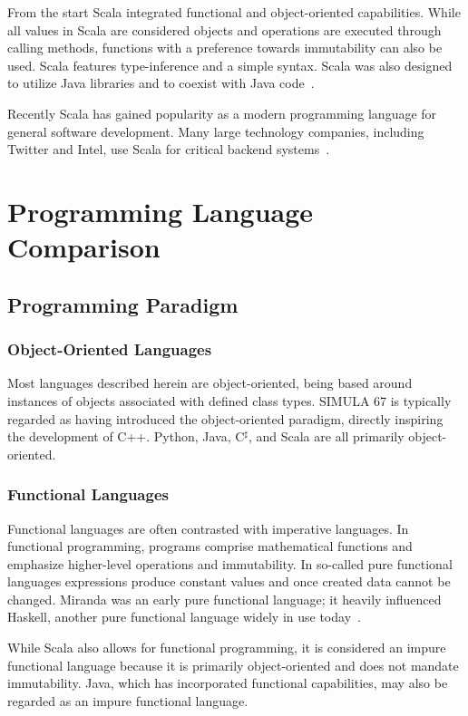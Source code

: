 \documentclass{article}
\begin{document}
From the start Scala integrated functional and object-oriented capabilities. While all values in Scala are considered objects and operations are executed through calling methods, functions with a preference towards immutability can also be used. Scala features type-inference and a simple syntax. Scala was also designed to utilize Java libraries and to coexist with Java code~\cite{scala2}.

Recently Scala has gained popularity as a modern programming language for general software development. Many large technology companies, including Twitter and Intel, use Scala for critical backend systems~\cite{scala2}.

\section{Programming Language Comparison}

\subsection{Programming Paradigm}

\subsubsection{Object-Oriented Languages}

Most languages described herein are object-oriented, being based around instances of objects associated with defined class types. SIMULA 67 is typically regarded as having introduced the object-oriented paradigm, directly inspiring the development of C++. Python, Java, C$^\sharp$, and Scala are all primarily object-oriented.

\subsubsection{Functional Languages}

Functional languages are often contrasted with imperative languages. In functional programming, programs comprise mathematical functions and emphasize higher-level operations and immutability. In so-called pure functional languages expressions produce constant values and once created data cannot be changed. Miranda was an early pure functional language; it heavily influenced Haskell, another pure functional language widely in use today~\cite{functional1}.

While Scala also allows for functional programming, it is considered an impure functional language because it is primarily object-oriented and does not mandate immutability. Java, which has incorporated functional capabilities, may also be regarded as an impure functional language.
\end{document}
